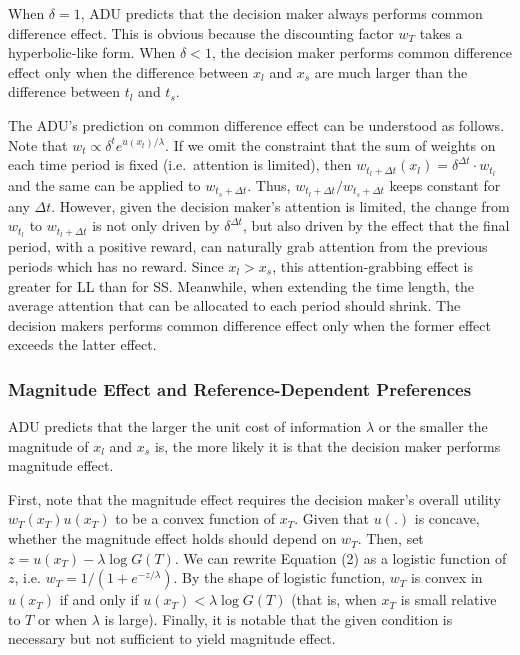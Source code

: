 \documentclass[
  12pt,
]{article}
\begin{document}
When \(\delta = 1\), ADU predicts that the decision maker always
performs common difference effect. This is obvious because the
discounting factor \(w_T\) takes a hyperbolic-like form. When
\(\delta<1\), the decision maker performs common difference effect only
when the difference between \(x_l\) and \(x_s\) are much larger than the
difference between \(t_l\) and \(t_s\).

The ADU's prediction on common difference effect can be understood as
follows. Note that \(w_t \propto \delta^t e^{u(x_t)/\lambda}\). If we
omit the constraint that the sum of weights on each time period is fixed
(i.e.~attention is limited), then
\(w_{t_l+\Delta t}(x_l) = \delta^{\Delta t} \cdot w_{t_l}\) and the same
can be applied to \(w_{t_s+\Delta t}\). Thus,
\(w_{t_l+\Delta t} / w_{t_s+\Delta t}\) keeps constant for any
\(\Delta t\). However, given the decision maker's attention is limited,
the change from \(w_{t_l}\) to \(w_{t_l+\Delta t}\) is not only driven
by \(\delta^{\Delta t}\), but also driven by the effect that the final
period, with a positive reward, can naturally grab attention from the
previous periods which has no reward. Since \(x_l > x_s\), this
attention-grabbing effect is greater for LL than for SS. Meanwhile, when
extending the time length, the average attention that can be allocated
to each period should shrink. The decision makers performs common
difference effect only when the former effect exceeds the latter effect.

\hypertarget{magnitude-effect-and-reference-dependent-preferences}{%
\subsubsection{Magnitude Effect and Reference-Dependent
Preferences}\label{magnitude-effect-and-reference-dependent-preferences}}

ADU predicts that the larger the unit cost of information \(\lambda\) or
the smaller the magnitude of \(x_l\) and \(x_s\) is, the more likely it
is that the decision maker performs magnitude effect.

First, note that the magnitude effect requires the decision maker's
overall utility \(w_T(x_T)u(x_T)\) to be a convex function of \(x_T\).
Given that \(u(.)\) is concave, whether the magnitude effect holds
should depend on \(w_T\). Then, set \(z = u(x_T)-\lambda\log G(T)\). We
can rewrite Equation (2) as a logistic function of \(z\), i.e.
\(w_T = 1/(1+e^{-z/\lambda})\). By the shape of logistic function,
\(w_T\) is convex in \(u(x_T)\) if and only if
\(u(x_T)<\lambda \log G(T)\) (that is, when \(x_T\) is small relative to
\(T\) or when \(\lambda\) is large). Finally, it is notable that the
given condition is necessary but not sufficient to yield magnitude
effect.
\end{document}
